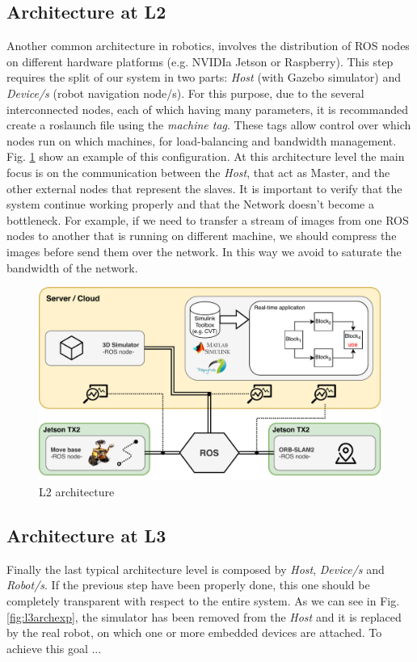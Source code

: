 \subsection{Architecture at L2} %
Another common architecture in robotics, involves the distribution of ROS nodes on different hardware platforms (e.g. NVIDIa Jetson or Raspberry). 
This step requires the split of our system in two parts: \textit{Host} (with Gazebo simulator) and \textit{Device/s} (robot navigation node/s). For this purpose, due to the several interconnected nodes, each of which having many parameters, it is recommanded create a roslaunch file  using the \textit{machine tag}. These tags allow control over which nodes run on which machines, for load-balancing and bandwidth management. Fig. \ref{fig:l2arch} show an example of this configuration. At this architecture level the main focus is on the communication between the \textit{Host}, that act as Master, and the other external nodes that represent the slaves. It is important to verify that the system continue working properly and that the Network doesn't become a bottleneck. For example, if we need to transfer a stream of images from one ROS nodes to another that is running on different machine, we should compress the images before send them over the network. In this way we avoid to saturate the bandwidth of the network.

\begin{figure}
	\centering
	\includegraphics[width=\textwidth]{images/L2-arch}
	\caption{L2 architecture}
	\label{fig:l2arch}
\end{figure}




\subsection{Architecture at L3}	%
Finally the last typical architecture level is composed by \textit{Host}, \textit{Device/s } and  \textit{Robot/s}. If the previous step have been properly done, this one should be completely 
transparent with respect to the entire system. 
As we can see in Fig. \ref{fig:l3archexp}, the simulator has been removed from the \textit{Host} and it is replaced by the real robot, on which one or more embedded devices are attached.
To achieve this goal ... 


